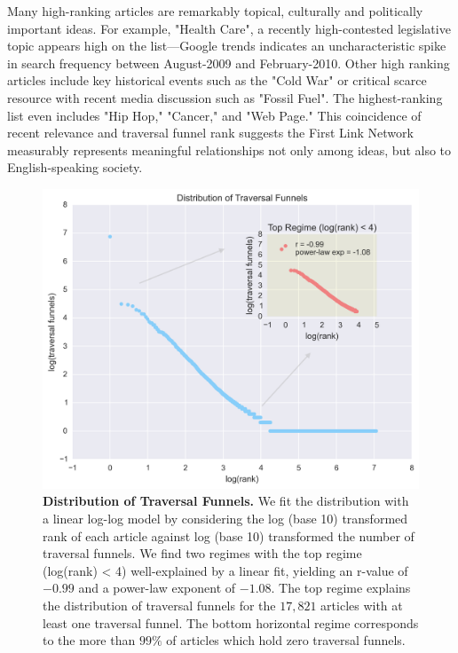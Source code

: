 \documentclass[pre,twocolumn,twoside,superscriptaddress,floatfix, aps, 10pt]{revtex4-1}
\begin{document}
Many high-ranking articles are remarkably topical, culturally and politically important ideas.  For example, "Health Care", a recently high-contested legislative topic appears high on the list---Google trends indicates an uncharacteristic spike in search frequency between August-2009 and February-2010.
Other high ranking articles include key historical events such as the "Cold War" or critical scarce resource with recent 
media discussion such as "Fossil Fuel". 
The highest-ranking list even includes "Hip Hop," "Cancer," and "Web Page."
This coincidence of recent relevance and traversal funnel rank suggests the First Link Network measurably represents
meaningful relationships not only among ideas, but also to English-speaking society. 
\begin{figure}[tp!]
  \centering	
  \includegraphics[width=\columnwidth]{graphics/funnels_distribution.png}
  \caption{
    \textbf{Distribution of Traversal Funnels.}
  We fit the distribution with a linear log-log model by considering the log (base 10) transformed rank of each article against log (base 10) transformed the number of traversal funnels. 
  We find two regimes with the top regime (log(rank) < 4) 
  well-explained by a linear fit, yielding an r-value of $-0.99$ and a 
  power-law exponent of $-1.08$. The top regime 
  explains the distribution of traversal funnels for the $17, 821$ 
  articles with at least one traversal funnel. The bottom 
  horizontal regime corresponds to the more than $99\%$ of articles
  which hold zero traversal funnels.
  }
  \label{fig:Funnels Distribution}
\end{figure}
\end{document}
